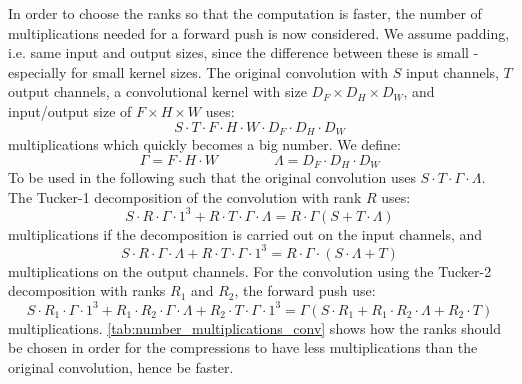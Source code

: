 In order to choose the ranks so that the computation is faster, the number of multiplications needed for a forward push is now considered. We assume padding, i.e. same input and output sizes, since the difference between these is small - especially for small kernel sizes. The original convolution with $S$ input channels, $T$ output channels, a convolutional kernel with size $D_F\times D_H \times D_W$, and input/output size of $F\times H \times W$ uses:
\begin{equation}
    S \cdot T \cdot F \cdot H \cdot W \cdot D_F \cdot D_H \cdot D_W
\end{equation}
multiplications which quickly becomes a big number. We define:
\begin{equation}
    \Gamma = F \cdot H \cdot W \qquad \qquad \Lambda = D_F \cdot D_H \cdot D_W
    \label{eq:lambda_gamma_definition}
\end{equation}
To be used in the following such that the original convolution uses $S\cdot T \cdot \Gamma \cdot \Lambda$. The Tucker-1 decomposition of the convolution with rank $R$ uses:
\begin{equation}
S \cdot R \cdot \Gamma \cdot 1^3 + R\cdot T \cdot \Gamma \cdot \Lambda = R\cdot \Gamma \left( S + T\cdot \Lambda \right)
\end{equation}
multiplications if the decomposition is carried out on the input channels, and
\begin{equation}
    S \cdot R \cdot \Gamma \cdot \Lambda + R \cdot T \cdot \Gamma \cdot 1^3 = R \cdot \Gamma \cdot \left( S \cdot \Lambda + T \right)
\end{equation}
multiplications on the output channels. For the convolution using the Tucker-2 decomposition with ranks $R_1$ and $R_2$, the forward push use:
\begin{equation}
    S\cdot R_1 \cdot \Gamma \cdot 1^3 + R_1 \cdot R_2 \cdot \Gamma \cdot \Lambda + R_2 \cdot T \cdot \Gamma \cdot 1^3 = \Gamma \left( S\cdot R_1 + R_1\cdot R_2 \cdot \Lambda + R_2\cdot T \right)
\end{equation}
multiplications. \autoref{tab:number_multiplications_conv} shows how the ranks should be chosen in order for the compressions to have less multiplications than the original convolution, hence be faster.
